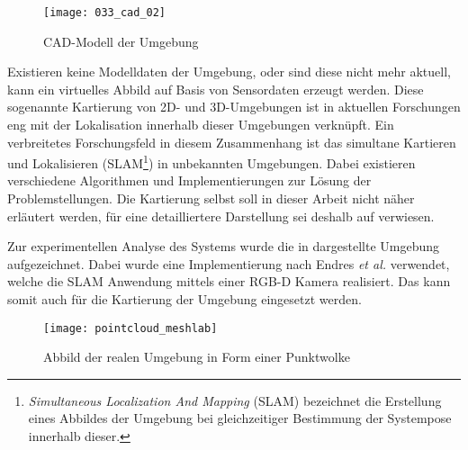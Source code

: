 
\begin{figure}[ht]
	\begin{center}
		\texttt{[image: 033\_cad\_02]}
		\caption{CAD-Modell der Umgebung}
		\label{fig.mapMod}
	\end{center}
\end{figure}

Existieren keine Modelldaten der Umgebung, oder sind diese nicht mehr aktuell, kann ein virtuelles Abbild auf Basis von Sensordaten erzeugt werden. Diese sogenannte Kartierung von 2D- und 3D-Umgebungen ist in aktuellen Forschungen eng mit der Lokalisation innerhalb dieser Umgebungen verknüpft. Ein verbreitetes Forschungsfeld in diesem Zusammenhang ist das simultane Kartieren und Lokalisieren (SLAM\footnote{\textit{Simultaneous Localization And Mapping} (SLAM) bezeichnet die Erstellung eines Abbildes der Umgebung bei gleichzeitiger Bestimmung der Systempose innerhalb dieser.}) in unbekannten Umgebungen. Dabei existieren verschiedene Algorithmen und Implementierungen zur Lösung der Problemstellungen. Die Kartierung selbst soll in dieser Arbeit nicht näher erläutert werden, für eine detailliertere Darstellung sei deshalb auf \cite{Durrant2006} verwiesen.\\


Zur experimentellen Analyse des Systems wurde die in  dargestellte Umgebung aufgezeichnet. Dabei wurde eine Implementierung \cite{Rgbdslam} nach Endres \textit{et al.} \cite{Endres2014} verwendet, welche die SLAM Anwendung mittels einer RGB-D Kamera realisiert. Das \kps{} kann somit auch für die Kartierung der Umgebung eingesetzt werden.\\

\begin{figure}[ht]
	\begin{center}
		\texttt{[image: pointcloud\_meshlab]}
		\caption{Abbild der realen Umgebung in Form einer Punktwolke}
		\label{fig.mapSLAM}
	\end{center}
\end{figure}


